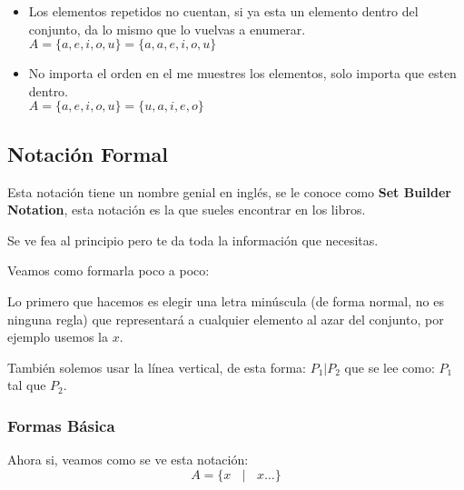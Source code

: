 \documentclass[12pt]{report}                                    %
\DeclareMathOperator \Space {\quad}                             %
\DeclareMathOperator \MiniSpace {\ }                            %
\newcommand \Such {\MiniSpace|\MiniSpace}                       %
\begin{document}
                \begin{itemize}
                    \item Los elementos repetidos no cuentan, si ya esta un elemento dentro del
                        conjunto, da lo mismo que lo vuelvas a enumerar.\\
                        $A = \{a, e, i, o, u\} = \{a, a, e, i, o, u\}$

                    \item No importa el orden en el me muestres los elementos,
                        solo importa que esten dentro.\\
                        $A = \{a, e, i, o, u\} = \{u, a, i, e, o\}$
                \end{itemize}



            \clearpage
            \subsection{Notación Formal} 

                Esta notación tiene un nombre genial en inglés, se le conoce como \textbf{Set Builder Notation},
                esta notación es la que sueles encontrar en los libros. 

                Se ve fea al principio pero te da toda la información que necesitas.

                Veamos como formarla poco a poco:

                Lo primero que hacemos es elegir una letra minúscula (de forma normal, no es ninguna regla)
                que representará a cualquier elemento al azar del conjunto, por ejemplo usemos la $x$.

                También solemos usar la línea vertical, de esta forma: $P_1 | P_2$ que se lee como: 
                $P_1$ tal que $P_2$.  

                \subsubsection*{Formas Básica}

                    Ahora si, veamos como se ve esta notación:
                    \begin{equation}   
                        A = \{ x \Such x \dots \}
                    \end{equation}
\end{document}

